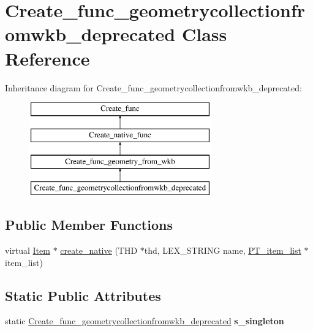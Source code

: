 \hypertarget{classCreate__func__geometrycollectionfromwkb__deprecated}{}\section{Create\+\_\+func\+\_\+geometrycollectionfromwkb\+\_\+deprecated Class Reference}
\label{classCreate__func__geometrycollectionfromwkb__deprecated}
Inheritance diagram for Create\+\_\+func\+\_\+geometrycollectionfromwkb\+\_\+deprecated\+:\begin{figure}[H]
\begin{center}
\leavevmode
\includegraphics[height=4.000000cm]{classCreate__func__geometrycollectionfromwkb__deprecated}
\end{center}
\end{figure}
\subsection*{Public Member Functions}
\begin{DoxyCompactItemize}
\item 
virtual \mbox{\hyperlink{classItem}{Item}} $\ast$ \mbox{\hyperlink{classCreate__func__geometrycollectionfromwkb__deprecated_a143fde30a0fff5b0f79456a9ea9c5ae0}{create\+\_\+native}} (T\+HD $\ast$thd, L\+E\+X\+\_\+\+S\+T\+R\+I\+NG name, \mbox{\hyperlink{classPT__item__list}{P\+T\+\_\+item\+\_\+list}} $\ast$item\+\_\+list)
\end{DoxyCompactItemize}
\subsection*{Static Public Attributes}
\begin{DoxyCompactItemize}
\item 
\mbox{\label{classCreate__func__geometrycollectionfromwkb__deprecated_ab464dc6f56f142482ad6b7a59a61acb6}} 
static \mbox{\hyperlink{classCreate__func__geometrycollectionfromwkb__deprecated}{Create\+\_\+func\+\_\+geometrycollectionfromwkb\+\_\+deprecated}} {\bfseries s\+\_\+singleton}
\end{DoxyCompactItemize}
